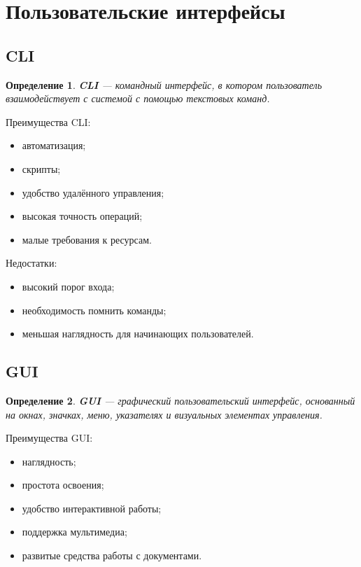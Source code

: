 \documentclass[12pt,a4paper]{article}
\newtheorem{definition}{Определение}
\begin{document}
\section{Пользовательские интерфейсы}

\subsection{CLI}

\begin{definition}
\textbf{CLI} --- командный интерфейс, в котором пользователь взаимодействует с системой с помощью текстовых команд.
\end{definition}

Преимущества CLI:

\begin{itemize}
    \item автоматизация;
    \item скрипты;
    \item удобство удалённого управления;
    \item высокая точность операций;
    \item малые требования к ресурсам.
\end{itemize}

Недостатки:

\begin{itemize}
    \item высокий порог входа;
    \item необходимость помнить команды;
    \item меньшая наглядность для начинающих пользователей.
\end{itemize}

\subsection{GUI}

\begin{definition}
\textbf{GUI} --- графический пользовательский интерфейс, основанный на окнах, значках, меню, указателях и визуальных элементах управления.
\end{definition}

Преимущества GUI:

\begin{itemize}
    \item наглядность;
    \item простота освоения;
    \item удобство интерактивной работы;
    \item поддержка мультимедиа;
    \item развитые средства работы с документами.
\end{itemize}
\end{document}
